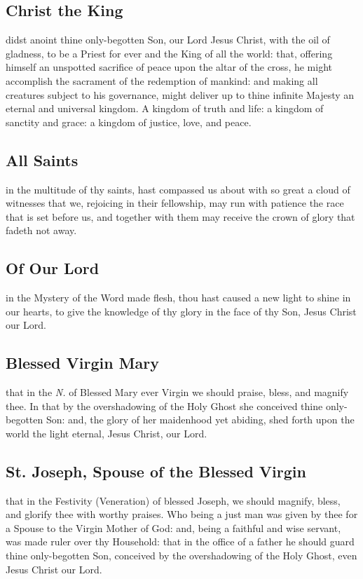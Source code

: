 \begin{multicols}{2}
\subsection{Christ the King}%
\noindent
{} didst anoint thine only-begotten Son, our Lord Jesus Christ, with the oil of gladness, to be a Priest for ever and the King of all the world: that, offering himself an unspotted sacrifice of peace upon the altar of the cross, he might accomplish the sacrament of the redemption of mankind: and making all creatures subject to his governance, might deliver up to thine infinite Majesty an eternal and universal kingdom. A kingdom of truth and life: a kingdom of sanctity and grace: a kingdom of justice, love, and peace.

\subsection{All Saints}%
\noindent
{} in the multitude of thy saints, hast compassed us about with so great a cloud of witnesses that we, rejoicing in their fellowship, may run with patience the race that is set before us, and together with them may receive the crown of glory that fadeth not away.

\subsection{Of Our Lord}
\noindent
{} in the Mystery of the Word made flesh, thou hast caused a new light to shine in our hearts, to give the knowledge of thy glory in the face of thy Son, Jesus Christ our Lord.

\subsection{Blessed Virgin Mary}
\noindent
{} that in the \textit{N.} of Blessed Mary ever Virgin we should praise, bless, and magnify thee. In that by the overshadowing of the Holy Ghost she conceived thine only-begotten Son: and, the glory of her maidenhood yet abiding, shed forth upon the world the light eternal, Jesus Christ, our Lord.

\subsection{St. Joseph, Spouse of the Blessed Virgin}
\noindent
{} that in the Festivity (Veneration) of blessed Joseph, we should magnify, bless, and glorify thee with worthy praises. Who being a just man was given by thee for a Spouse to the Virgin Mother of God: and, being a faithful and wise servant, was made ruler over thy Household: that in the office of a father he should guard thine only-begotten Son, conceived by the overshadowing of the Holy Ghost, even Jesus Christ our Lord.


\end{multicols}
